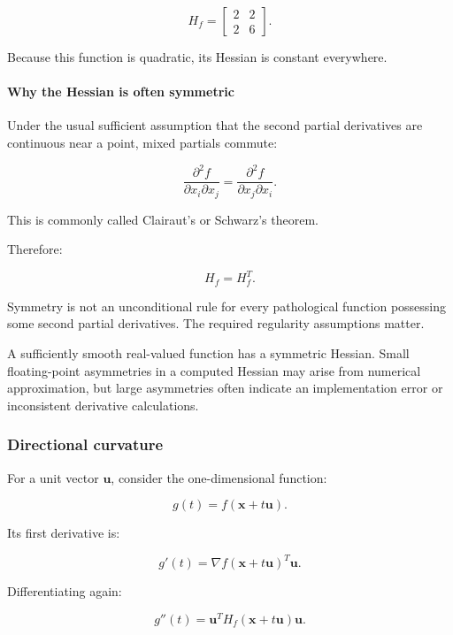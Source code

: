 \[
\boxed{ H_f= \begin{bmatrix} 2&2\\ 2&6 \end{bmatrix} }.
\]

Because this function is quadratic, its Hessian is constant everywhere.

\paragraph{Why the Hessian is often symmetric}\label{02-foundations-ii-ch021-why-the-hessian-is-often-symmetric}

\hypertarget{02-foundations-ii-ch021-why-the-hessian-is-often-symmetric}{}

Under the usual sufficient assumption that the second partial derivatives are continuous near a point, mixed partials commute:

\[
\frac{\partial^2f}{\partial x_i\partial x_j} = \frac{\partial^2f}{\partial x_j\partial x_i}.
\]

This is commonly called Clairaut's or Schwarz's theorem.

Therefore:

\[
H_f=H_f^T.
\]

Symmetry is not an unconditional rule for every pathological function possessing some second partial derivatives. The required regularity assumptions matter.

A sufficiently smooth real-valued function has a symmetric Hessian. Small floating-point asymmetries in a computed Hessian may arise from numerical approximation, but large asymmetries often indicate an implementation error or inconsistent derivative calculations.

\subsubsection{Directional curvature}\label{02-foundations-ii-ch021-directional-curvature}

\hypertarget{02-foundations-ii-ch021-directional-curvature}{}

For a unit vector \(\mathbf u\), consider the one-dimensional function:

\[
g(t)=f(\mathbf x+t\mathbf u).
\]

Its first derivative is:

\[
g'(t)=\nabla f(\mathbf x+t\mathbf u)^T\mathbf u.
\]

Differentiating again:

\[
g''(t)=\mathbf u^TH_f(\mathbf x+t\mathbf u)\mathbf u.
\]

